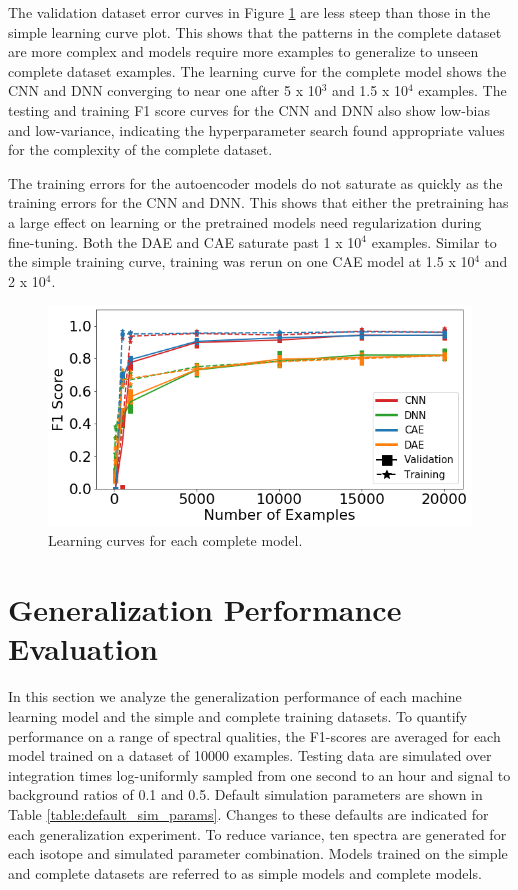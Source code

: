 The validation dataset error curves in Figure \ref{fig:learning_curves_full} are less steep than those in the simple learning curve plot. This shows that the patterns in the complete dataset are more complex and models require more examples to generalize to unseen complete dataset examples. The learning curve for the complete model shows the CNN and DNN converging to near one after 5 x 10$^{3}$ and 1.5 x 10$^{4}$ examples. The testing and training F1 score curves for the CNN and DNN also show low-bias and low-variance, indicating the hyperparameter search found appropriate values for the complexity of the complete dataset.

The training errors for the autoencoder models do not saturate as quickly as the training errors for the CNN and DNN. This shows that either the pretraining has a large effect on learning or the pretrained models need regularization during fine-tuning. Both the DAE and CAE saturate past 1 x 10$^{4}$ examples. Similar to the simple training curve, training was rerun on one CAE model at 1.5 x 10$^{4}$ and 2 x 10$^{4}$.


\begin{figure}[H]
	\centering
	\includegraphics[width=0.9\linewidth]{images/learning_curves_full}
	\caption{Learning curves for each complete model.}
	\label{fig:learning_curves_full}
\end{figure}



\section{Generalization Performance Evaluation}

In this section we analyze the generalization performance of each machine learning model and the simple and complete training datasets. To quantify performance on a range of spectral qualities, the F1-scores are averaged for each model trained on a dataset of 10000 examples. Testing data are simulated over integration times log-uniformly sampled from one second to an hour and signal to background ratios of 0.1 and 0.5. Default simulation parameters are shown in Table \ref{table:default_sim_params}. Changes to these defaults are indicated for each generalization experiment. To reduce variance, ten spectra are generated for each isotope and simulated parameter combination. Models trained on the simple and complete datasets are referred to as simple models and complete models.

